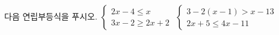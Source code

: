 다음 연립부등식을 푸시오.
 $\begin{cases} 2x-4\le x \\ 3x-2\ge 2x+2 \end{cases}$
 $\begin{cases} 3-2(x-1)>x-13 \\ 2x+5\le 4x-11 \end{cases}$
